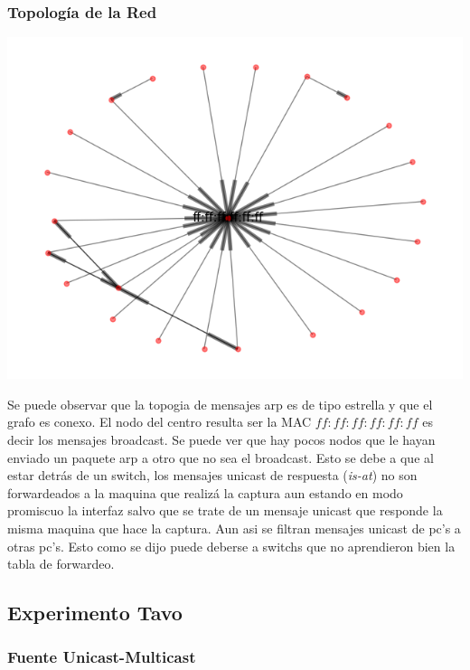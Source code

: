 \clearpage
\subsubsection{Topolog\'ia de la Red}
\begin{center}
 \includegraphics[scale=0.6]{../plots/trabajo_s2_topologia.png}
\end{center}

Se puede observar que la topogia de mensajes arp es de tipo estrella
y que el grafo es conexo. El nodo del centro resulta ser la MAC $ff:ff:ff:ff:ff:ff$
es decir los mensajes broadcast. Se puede ver que hay pocos nodos que le hayan
enviado un paquete arp a otro que no sea el broadcast. Esto se debe
a que al estar detrás de un switch, los mensajes unicast de respuesta (\textit{is-at})
no son forwardeados a la maquina que realizá la captura aun estando en modo promiscuo
la interfaz salvo que se trate de un mensaje unicast que responde la misma maquina que
hace la captura. Aun asi se filtran mensajes unicast de pc's a otras pc's. Esto como
se dijo puede deberse a switchs que no aprendieron bien la tabla de forwardeo.

\subsection{Experimento Tavo}

\subsubsection{Fuente Unicast-Multicast}

